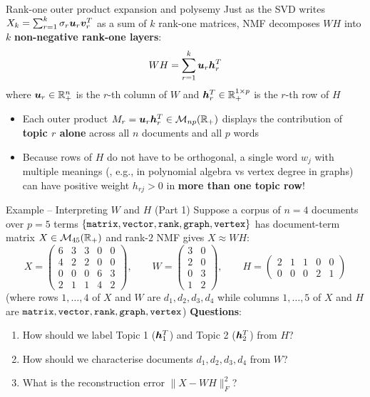 \documentclass[aspectratio=169]{beamer}\usepackage[]{graphicx}\usepackage[]{xcolor}
\begin{document}
\begin{frame}{Rank-one outer product expansion and polysemy}
Just as the SVD writes $X_k = \sum_{r=1}^k \sigma_r \bm{u}_r \bm{v}_r^T$ as a sum of $k$ rank-one matrices, NMF decomposes $W H$ into $k$ \textbf{non-negative rank-one layers}:
\[
W H = \sum_{r=1}^k \bm{u}_r \bm{h}_r^T
\]
where $\bm{u}_r \in \mathbb{R}_+^n$ is the $r$-th column of $W$ and $\bm{h}_r^T \in \mathbb{R}_+^{1 \times p}$ is the $r$-th row of $H$
\vfill
\begin{itemize}
\item Each outer product $M_r = \bm{u}_r \bm{h}_r^T \in \mathcal{M}_{np}(\mathbb{R}_+)$ displays the contribution of \textbf{topic $r$ alone} across all $n$ documents and all $p$ words
\item Because rows of $H$ do not have to be orthogonal, a single word $w_j$ with multiple meanings (, e.g.,  in polynomial algebra vs vertex degree in graphs) can have positive weight $h_{rj} > 0$ in \textbf{more than one topic row}!
\end{itemize}
\end{frame}


\begin{frame}{Example -- Interpreting $W$ and $H$ (Part 1)}
Suppose a corpus of $n=4$ documents over $p=5$ terms $\{{\tt matrix}, {\tt vector}, {\tt rank}, {\tt graph}, {\tt vertex}\}$ has document-term matrix $X \in \mathcal{M}_{45}(\mathbb{R}_+)$ and rank-$2$ NMF gives $X \approx W H$:
\[
X = \begin{pmatrix}
6 & 3 & 3 & 0 & 0 \\
4 & 2 & 2 & 0 & 0 \\
0 & 0 & 0 & 6 & 3 \\
2 & 1 & 1 & 4 & 2
\end{pmatrix},
\qquad
W = \begin{pmatrix}
3 & 0 \\
2 & 0 \\
0 & 3 \\
1 & 2
\end{pmatrix},
\qquad
H = \begin{pmatrix}
2 & 1 & 1 & 0 & 0 \\
0 & 0 & 0 & 2 & 1
\end{pmatrix}
\]
(where rows $1,\ldots,4$ of $X$ and $W$ are $d_1, d_2, d_3, d_4$ while columns $1,\ldots,5$ of $X$ and $H$ are ${\tt matrix}, {\tt vector}, {\tt rank}, {\tt graph}, {\tt vertex}$)
\vfill
\textbf{Questions}:
\begin{enumerate}
\item How should we label Topic 1 ($\bm{h}_1^T$) and Topic 2 ($\bm{h}_2^T$) from $H$?
\item How should we characterise documents $d_1, d_2, d_3, d_4$ from $W$?
\item What is the reconstruction error $\|X - WH\|_F^2$?
\end{enumerate}
\end{frame}
\end{document}
